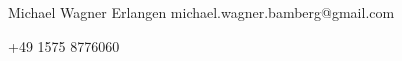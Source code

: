 \documentclass[michiscolours]{hipstercv}
\newlength{\rightcolwidth}
\begin{document}
\begin{paracol}{2}
\vfill{} %
\setlength{\parindent}{0pt}
\begin{minipage}[t]{\rightcolwidth}
\begin{center}\fontfamily{\sfdefault}\selectfont \color{black!70}
{
\small Michael Wagner 
 Erlangen 
 michael.wagner.bamberg@gmail.com \newline 

 +49 1575 8776060 
}
\end{center}
\end{minipage}

\newpage

\end{paracol}
\end{document}
